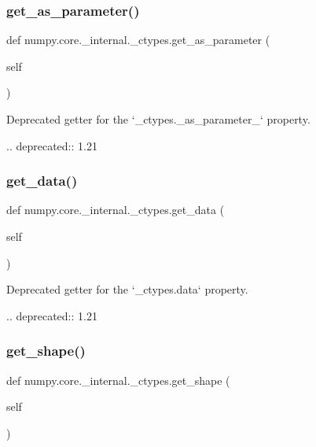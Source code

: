 \subsubsection{\texorpdfstring{get\+\_\+as\+\_\+parameter()}{get\_as\_parameter()}}
{\footnotesize\ttfamily def numpy.\+core.\+\_\+internal.\+\_\+ctypes.\+get\+\_\+as\+\_\+parameter (\begin{DoxyParamCaption}\item[{}]{self }\end{DoxyParamCaption})}

\begin{DoxyVerb}Deprecated getter for the `_ctypes._as_parameter_` property.

.. deprecated:: 1.21
\end{DoxyVerb}
 \mbox{\label{classnumpy_1_1core_1_1__internal_1_1__ctypes_a4ab2b9a4d61454fc5f2fa86c6abe7d57}} 
\subsubsection{\texorpdfstring{get\+\_\+data()}{get\_data()}}
{\footnotesize\ttfamily def numpy.\+core.\+\_\+internal.\+\_\+ctypes.\+get\+\_\+data (\begin{DoxyParamCaption}\item[{}]{self }\end{DoxyParamCaption})}

\begin{DoxyVerb}Deprecated getter for the `_ctypes.data` property.

.. deprecated:: 1.21
\end{DoxyVerb}
 \mbox{\label{classnumpy_1_1core_1_1__internal_1_1__ctypes_a76e754263c16d6c016b2cdd1249b7d47}} 
\subsubsection{\texorpdfstring{get\+\_\+shape()}{get\_shape()}}
{\footnotesize\ttfamily def numpy.\+core.\+\_\+internal.\+\_\+ctypes.\+get\+\_\+shape (\begin{DoxyParamCaption}\item[{}]{self }\end{DoxyParamCaption})}

